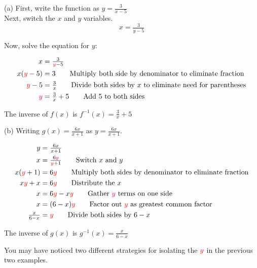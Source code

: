 \begin{solution}

(a) First, write the function as $y = \tfrac{3}{x-5}$ \newline\\

Next, switch the $x$ and $y$ variables. 
\[
x = \tfrac{3}{y-5}
\]

Now, solve the equation for $y$:

\begin{align*}
    x &= \tfrac{3}{{\color{red}{y}} - 5} \\
    x({\color{red}{y}} - 5) &= 3 \qquad \text{Multiply both side by denominator to eliminate fraction} \\
    {\color{red}{y}} - 5 &= \tfrac{3}{x} \qquad \text{Divide both sides by $x$ to eliminate need for parentheses} \\
    {\color{red}{y}} &= \tfrac{3}{x} + 5 \qquad \text{Add 5 to both sides} 
\end{align*}

The inverse of $f(x)$ is $\boxed{f^{-1}(x) = \tfrac{3}{x} + 5}$ 

\vspace{0.25in}

(b) Writing $g(x) = \tfrac{6x}{x+1}$ as $y = \tfrac{6x}{x+1}$.

\begin{align*} 
    y &= \tfrac{6x}{x+1} \\
    x &= \tfrac{6{\color{red}{y}}}{{\color{red}{y}}+1} \qquad \text{Switch $x$ and $y$} \\
    x({\color{red}{y}}+1) &= 6{\color{red}{y}} \qquad \text{Multiply both sides by denominator to eliminate fraction} \\
    x{\color{red}{y}} + x &= 6{\color{red}{y}} \qquad \text{Distribute the $x$} \\
    x &= 6{\color{red}{y}} - x{\color{red}{y}} \qquad \text{Gather ${\color{red}{y}}$ terms on one side} \\
    x &= (6-x){\color{red}{y}} \qquad \text{Factor out ${\color{red}{y}}$ as greatest common factor} \\
    \tfrac{x}{6-x} &= {\color{red}{y}} \qquad \text{Divide both sides by $6-x$} 
\end{align*}

The inverse of $g(x)$ is $\boxed{g^{-1}(x) = \tfrac{x}{6-x}}$ \newline\\

\dotfill \newline

You may have noticed two different strategies for isolating the ${\color{red}{y}}$ in the previous two examples. \newline


\end{solution}
